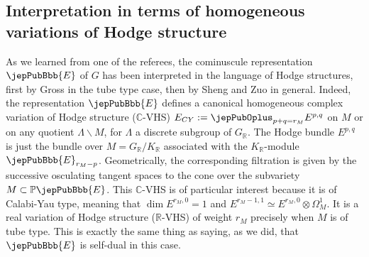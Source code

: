 \subsection{Interpretation in terms of homogeneous variations of Hodge structure}
As we learned from one of the referees, the cominuscule representation $\jepPubBbb{E}$ of $G$ has been interpreted in the language of Hodge structures, first by Gross \cite{jep93Gro94} in the tube type case, then by Sheng and Zuo \cite{jep93SZ10} in general. Indeed, the representation $\jepPubBbb{E}$ defines a canonical homogeneous complex variation of Hodge structure ($\mathbb C$-VHS) $E_{CY}:=\jepPubOplus_{p+q=r_M}E^{p,q}$ on $M$ or on any quotient $\Lambda\backslash M$, for $\Lambda$ a discrete subgroup of $G_{\mathbb R}$. The Hodge bundle $E^{p,q}$ is just the bundle over $M=G_{\mathbb R}/K_{\mathbb R}$ associated with the $K_{\mathbb R}$-module $\jepPubBbb{E}_{r_M-p}$. Geometrically, the corresponding filtration is given by the successive osculating tangent spaces to the cone over the subvariety $M\subset\mathbb P\jepPubBbb{E}$. This $\mathbb C$-VHS is of particular interest because it is of Calabi-Yau type, meaning that $\dim E^{r_M,0}=1$ and $E^{r_M-1,1}\simeq E^{r_M,0}\otimes\Omega_M^1$. It is a real variation of Hodge structure ($\mathbb R$-VHS) of weight $r_M$ precisely when $M$ is of tube type. This is exactly the same thing as saying, as we did, that $\jepPubBbb{E}$ is self-dual in this case.

